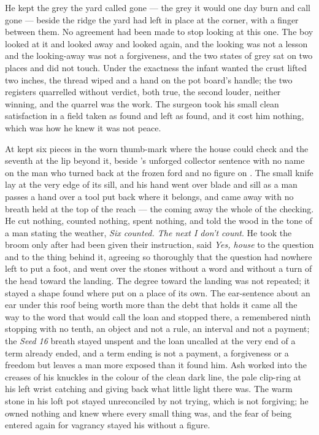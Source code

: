 He kept the grey the yard called gone --- the grey it would one day burn and call gone --- beside the ridge the yard had left in place at the corner, with a finger between them. No agreement had been made to stop looking at this one. The boy looked at it and looked away and looked again, and the looking was not a lesson and the looking-away was not a forgiveness, and the two states of grey sat on two places and did not touch. Under the exactness the infant wanted the crust lifted two inches, the thread wiped and a hand on the pot board's handle; the two registers quarrelled without verdict, both true, the second louder, neither winning, and the quarrel was the work. The surgeon took his small clean satisfaction in a field taken as found and left as found, and it cost him nothing, which was how he knew it was not peace.

At   kept six pieces in the worn thumb-mark where the house could check and the seventh at the lip beyond it, beside 's unforged collector sentence with no name on the man who turned back at the frozen ford and no figure on . The small knife lay at the very edge of its sill, and his hand went over blade and sill as a man passes a hand over a tool put back where it belongs, and came away with no breath held at the top of the reach --- the coming away the whole of the checking. He cut nothing, counted nothing, spent nothing, and told the wood in the tone of a man stating the weather, \emph{Six counted. The next I don't count}. He took the broom only after  had been given their instruction, said \emph{Yes, house} to the question and to the thing behind it, agreeing so thoroughly that the question had nowhere left to put a foot, and went over the stones without a word and without a turn of the head toward the landing. The degree toward the landing was not repeated; it stayed a shape found where put on a place of its own. The ear-sentence about an ear under this roof being worth more than the debt that holds it came all the way to the word that would call the loan and stopped there, a remembered ninth stopping with no tenth, an object and not a rule, an interval and not a payment; the \emph{Seed 16} breath stayed unspent and the loan uncalled at the very end of a term already ended, and a term ending is not a payment, a forgiveness or a freedom but leaves a man more exposed than it found him. Ash worked into the creases of his knuckles in the colour of the clean dark line, the pale clip-ring at his left wrist catching and giving back what little light there was. The warm stone in his loft pot stayed unreconciled by not trying, which is not forgiving; he owned nothing and knew where every small thing was, and the fear of being entered again for vagrancy stayed his without a figure.

